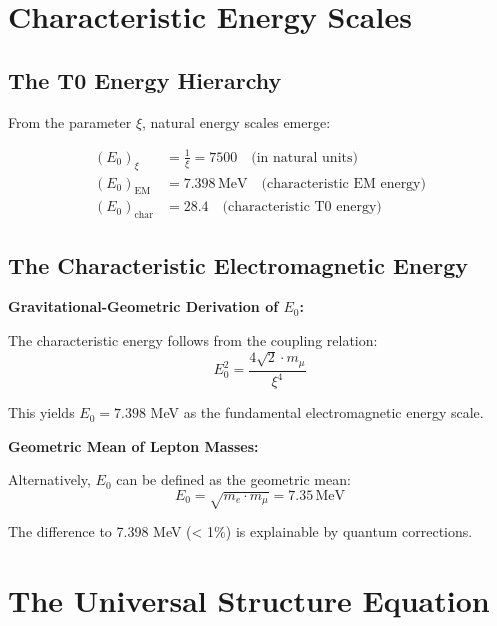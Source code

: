 	\section{Characteristic Energy Scales}
	
	\subsection{The T0 Energy Hierarchy}
	
	From the parameter $\xi$, natural energy scales emerge:
	
	\begin{align}
		(E_0)_{\xi} &= \frac{1}{\xi} = 7500 \quad \text{(in natural units)} \\
		(E_0)_{\text{EM}} &= 7.398\,\mathrm{MeV} \quad \text{(characteristic EM energy)} \\
		(E_0)_{\text{char}} &= 28.4 \quad \text{(characteristic T0 energy)}
	\end{align}
	
	\subsection{The Characteristic Electromagnetic Energy}
	
	\begin{keyresult}
		\textbf{Gravitational-Geometric Derivation of $E_0$:}
		
		The characteristic energy follows from the coupling relation:
		\begin{equation}
			E_0^2 = \frac{4\sqrt{2} \cdot m_\mu}{\xi^4}
		\end{equation}
		
		This yields $E_0 = 7.398$ MeV as the fundamental electromagnetic energy scale.
	\end{keyresult}
	
	\begin{alternative}
		\textbf{Geometric Mean of Lepton Masses:}
		
		Alternatively, $E_0$ can be defined as the geometric mean:
		\begin{equation}
			E_0 = \sqrt{m_e \cdot m_\mu} = 7.35\,\mathrm{MeV}
		\end{equation}
		
		The difference to 7.398 MeV (< 1\%) is explainable by quantum corrections.
	\end{alternative}
	
	\section{The Universal Structure Equation}
	
